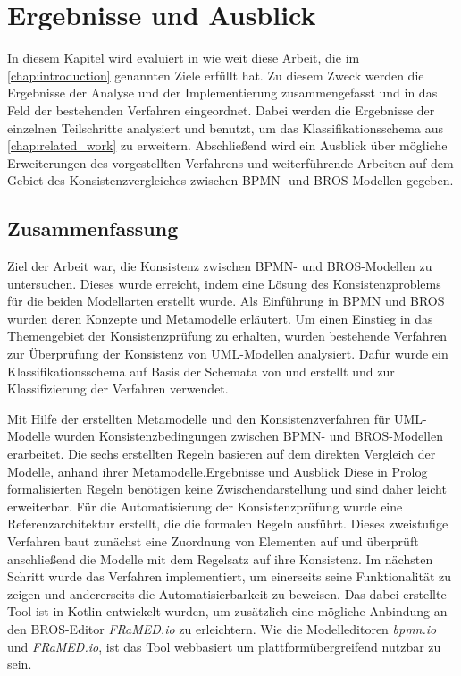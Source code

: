 \chapter{Ergebnisse und Ausblick}
\label{chap:conclusion}

In diesem Kapitel wird evaluiert in wie weit diese Arbeit, die im \cref{chap:introduction} genannten Ziele erfüllt hat.
Zu diesem Zweck werden die Ergebnisse der Analyse und der Implementierung zusammengefasst und in das Feld der bestehenden Verfahren eingeordnet.
Dabei werden die Ergebnisse der einzelnen Teilschritte analysiert und benutzt, um das Klassifikationsschema aus \cref{chap:related_work} zu erweitern.
Abschließend wird ein Ausblick über mögliche Erweiterungen des vorgestellten Verfahrens und weiterführende Arbeiten auf dem Gebiet des Konsistenzvergleiches zwischen BPMN- und BROS-Modellen gegeben.

\section{Zusammenfassung}

Ziel der Arbeit war, die Konsistenz zwischen BPMN- und BROS-Modellen zu untersuchen.
Dieses wurde erreicht, indem eine Lösung des Konsistenzproblems für die beiden Modellarten erstellt wurde.
Als Einführung in BPMN und BROS wurden deren Konzepte und Metamodelle erläutert.
Um einen Einstieg in das Themengebiet der Konsistenzprüfung zu erhalten, wurden bestehende Verfahren zur Überprüfung der Konsistenz von UML-Modellen analysiert.
Dafür wurde ein Klassifikationsschema auf Basis der Schemata von \cite{Usman2008} und \cite{Lucas2009} erstellt und zur Klassifizierung der Verfahren verwendet.

Mit Hilfe der erstellten Metamodelle und den Konsistenzverfahren für UML-Modelle wurden Konsistenzbedingungen zwischen BPMN- und BROS-Modellen erarbeitet.
Die sechs erstellten Regeln basieren auf dem direkten Vergleich der Modelle, anhand ihrer Metamodelle.Ergebnisse und Ausblick
Diese in Prolog formalisierten Regeln benötigen keine Zwischendarstellung und sind daher leicht erweiterbar.
Für die Automatisierung der Konsistenzprüfung wurde eine Referenzarchitektur erstellt, die die formalen Regeln ausführt.
Dieses zweistufige Verfahren baut zunächst eine Zuordnung von Elementen auf und überprüft anschließend die Modelle mit dem Regelsatz auf ihre Konsistenz.
Im nächsten Schritt wurde das Verfahren implementiert, um einerseits seine Funktionalität zu zeigen und andererseits die Automatisierbarkeit zu beweisen.
Das dabei erstellte Tool ist in Kotlin entwickelt wurden, um zusätzlich eine mögliche Anbindung an den BROS-Editor \emph{FRaMED.io} zu erleichtern.
Wie die Modelleditoren \emph{bpmn.io} und \emph{FRaMED.io}, ist das Tool webbasiert um plattformübergreifend nutzbar zu sein.

